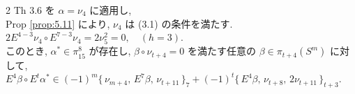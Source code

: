 \documentclass[10pt, leqno]{ltjsarticle}
\newcommand{\todai}[2][]{\{\,#2\,\}_{#1}}      %
\numberwithin{equation}{section}
\theoremstyle{plain}
\theoremstyle{definition}
\theoremstyle{remark}
\begin{document}
\begin{paracol}{2}
\noindent
Th 3.6 を \(\alpha=\nu_{4}\) に適用し, \\
Prop \ref{prop:5.11} により, 
\(\nu_4\) は (3.1) の条件を満たす. \\
\(
2E^{4-3}\nu_{4}\circ E^{7-3}\nu_{4}=2\nu_{5}^{2}=0,
\quad (h=3).
\)\\
このとき, 
\(\alpha^{\ast}\in\pi^{8}_{15}\) が存在し, 
\(\beta\circ\nu_{t+4}=0\) を満たす任意の \(\beta\in\pi_{t+4}(S^m)\) に対して, \\
\(
E^{4}\beta\circ E^t\alpha^{\ast}
\in (-1)^{m}\todai[7]{\nu_{m+4},\,E^{7}\beta,\,\nu_{t+11}}
+(-1)^{t}\todai[t+3]{E^{4}\beta,\,\nu_{t+8},\,2\nu_{t+11}} .
\)





\end{paracol}

\newpage
\end{document}

